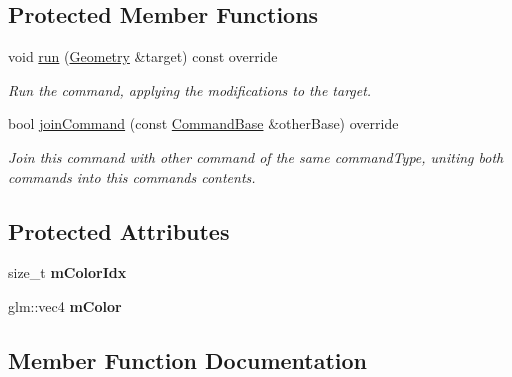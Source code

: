 \subsection*{Protected Member Functions}
\begin{DoxyCompactItemize}
\item 
\mbox{\label{classpepr3d_1_1_cmd_color_manager_change_color_a6a4258a4f2c7c7f4981c566e103e92fd}} 
void \mbox{\hyperlink{classpepr3d_1_1_cmd_color_manager_change_color_a6a4258a4f2c7c7f4981c566e103e92fd}{run}} (\mbox{\hyperlink{classpepr3d_1_1_geometry}{Geometry}} \&target) const override
\begin{DoxyCompactList}\small\item\em Run the command, applying the modifications to the target. \end{DoxyCompactList}\item 
bool \mbox{\hyperlink{classpepr3d_1_1_cmd_color_manager_change_color_a0c77133a022d16d1aa55ba477dade531}{join\+Command}} (const \mbox{\hyperlink{classpepr3d_1_1_command_base}{Command\+Base}} \&other\+Base) override
\begin{DoxyCompactList}\small\item\em Join this command with other command of the same command\+Type, uniting both commands into this command\textquotesingle{}s contents. \end{DoxyCompactList}\end{DoxyCompactItemize}
\subsection*{Protected Attributes}
\begin{DoxyCompactItemize}
\item 
\mbox{\label{classpepr3d_1_1_cmd_color_manager_change_color_afb2945590278744ce010cd5a3185f5d5}} 
size\+\_\+t {\bfseries m\+Color\+Idx}
\item 
\mbox{\label{classpepr3d_1_1_cmd_color_manager_change_color_a155f0360a4c85f7ba025db530c1125a7}} 
glm\+::vec4 {\bfseries m\+Color}
\end{DoxyCompactItemize}


\subsection{Member Function Documentation}
\mbox{\label{classpepr3d_1_1_cmd_color_manager_change_color_a0c77133a022d16d1aa55ba477dade531}} 
